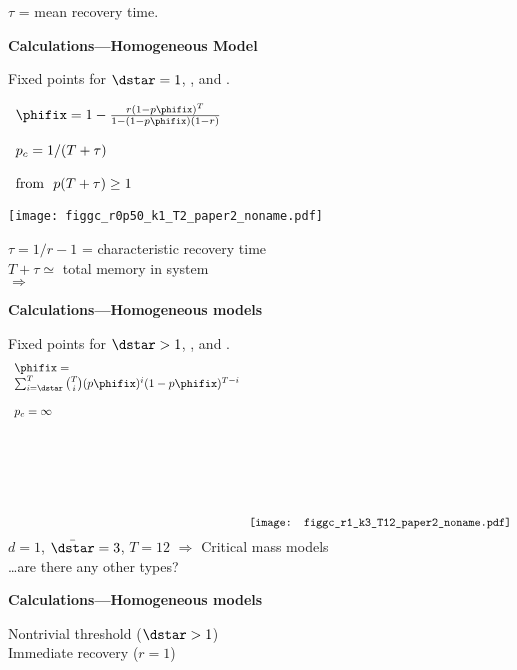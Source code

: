   \hfill $\tau$ = mean recovery time.



  \textbf{Calculations---Homogeneous Model}

  Fixed points for $\dstar=1$, ,  and .
      
    $
    \begin{array}{l}
      \phifix =
      1 - \frac{r (1-p\phifix)^T }
      {1 - (1-p\phifix)(1-r)}\\
      \\
      p_c = 1/(T+\tau)\\
      \\
      \mbox{from} \ \ p (T+\tau) \ge 1
    \end{array}
    $
    
  \texttt{[image: figgc\_r0p50\_k1\_T2\_paper2\_noname.pdf]}
  
  $\tau = 1/r - 1$ = characteristic recovery time\\
  $T + \tau \simeq $  total memory in system\\
  \hfill $\Rightarrow$  





  \textbf{Calculations---Homogeneous models}

  Fixed points for $\dstar > 1$, ,  and .\\
  $$
  \begin{array}{l}
  \phifix = \\
  \sum_{i=\dstar}^{T}
  \binom{T}{i}
  (p\phifix)^{i} (1 - p\phifix)^{T-i}\\
  \\
  p_c = \infty\\
  \end{array}
   \raisebox{-4cm}{
    \texttt{[image: figgc\_r1\_k3\_T12\_paper2\_noname.pdf]}}
  $$
  $d=1$, $\bar{\dstar}=3$, $T=12$ \hfill $\Rightarrow$ Critical mass models\\
  \hfill \ldots are there any other types?
  

  \textbf{Calculations---Homogeneous models}

   Nontrivial threshold ($\dstar > 1$) \\
   Immediate recovery ($r=1$)

